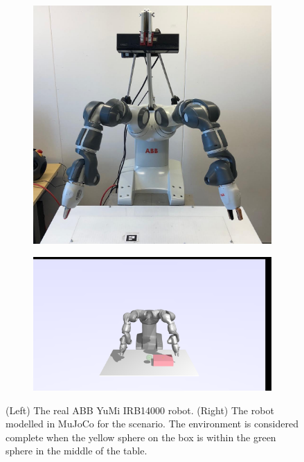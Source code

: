 \begin{figure}%
    \centering
    \begin{subfigure}{0.4\textwidth}
    \includegraphics[width=1\textwidth,trim=0 0 0 0,clip]{img/yumi/yumi-pose-real}
    \end{subfigure}
    \begin{subfigure}{0.4\textwidth}
    \includegraphics[width=1\textwidth,trim=800 240 810 250,clip]{img/yumi/yumi-pose-sim2}
    \end{subfigure}
    \caption{(Left) The real ABB YuMi IRB14000 robot. (Right) The robot modelled in MuJoCo for the \yp{} scenario. The environment is considered complete when the yellow sphere on the box is within the green sphere in the middle of the table.}
    \label{fig:robots}%
\end{figure}

